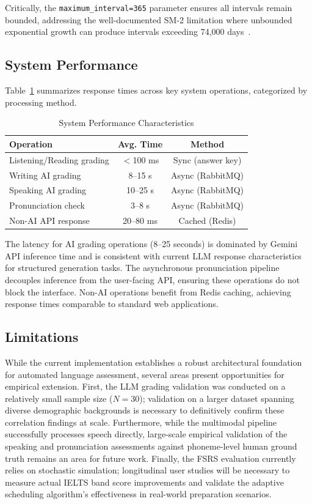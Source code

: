 \documentclass[conference]{IEEEtran}
\begin{document}
Critically, the \texttt{maximum\_interval=365} parameter ensures all intervals remain bounded, addressing the well-documented SM-2 limitation where unbounded exponential growth can produce intervals exceeding 74{,}000 days~\cite{sm2}.

\subsection{System Performance}

Table~\ref{tab:performance} summarizes response times across key system operations, categorized by processing method.

\begin{table}[!t]
\caption{System Performance Characteristics}
\label{tab:performance}
\centering
\begin{tabular}{lcc}
\toprule
\textbf{Operation} & \textbf{Avg. Time} & \textbf{Method} \\
\midrule
Listening/Reading grading & $<$100 ms  & Sync (answer key) \\
Writing AI grading        & 8--15 s    & Async (RabbitMQ) \\
Speaking AI grading       & 10--25 s   & Async (RabbitMQ) \\
Pronunciation check       & 3--8 s     & Async (RabbitMQ) \\
Non-AI API response       & 20--80 ms  & Cached (Redis) \\
\bottomrule
\end{tabular}
\end{table}

The latency for AI grading operations (8--25 seconds) is dominated by Gemini API inference time and is consistent with current LLM response characteristics for structured generation tasks. The asynchronous pronunciation pipeline decouples inference from the user-facing API, ensuring these operations do not block the interface. Non-AI operations benefit from Redis caching, achieving response times comparable to standard web applications.

\subsection{Limitations}

While the current implementation establishes a robust architectural foundation for automated language assessment, several areas present opportunities for empirical extension. First, the LLM grading validation was conducted on a relatively small sample size ($N=30$); validation on a larger dataset spanning diverse demographic backgrounds is necessary to definitively confirm these correlation findings at scale. Furthermore, while the multimodal pipeline successfully processes speech directly, large-scale empirical validation of the speaking and pronunciation assessments against phoneme-level human ground truth remains an area for future work. Finally, the FSRS evaluation currently relies on stochastic simulation; longitudinal user studies will be necessary to measure actual IELTS band score improvements and validate the adaptive scheduling algorithm's effectiveness in real-world preparation scenarios.
\end{document}
